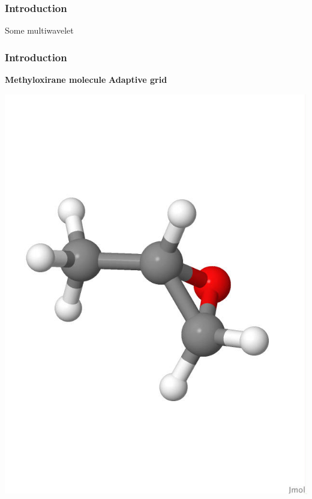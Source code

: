 \begin{frame}
\frametitle{Introduction}
\scriptsize
Some multiwavelet

\end{frame}

\begin{frame}
\frametitle{Introduction}
\scriptsize

\centering
\textbf{Methyloxirane molecule}
\hspace{30mm}
\textbf{Adaptive grid}
\begin{minipage}{0.5\textwidth}
\centering
\includegraphics[scale=0.15, viewport = 0 180 550 650, clip]{figures/methyloxirane_white.jpg}
\end{minipage}%
\begin{minipage}{0.5\textwidth}
\centering

\end{minipage}
\end{frame}
